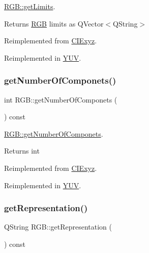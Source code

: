 \hyperlink{class_r_g_b_a4ae8d5c061e45f557a5924f2237c1d0e}{R\+G\+B\+::get\+Limits}. 

\begin{DoxyReturn}{Returns}
\hyperlink{class_r_g_b}{R\+GB} limits as Q\+Vector$<$\+Q\+String$>$ 
\end{DoxyReturn}


Reimplemented from \hyperlink{class_c_i_exyz_a4c3aa6777f7720ae26b53174322a83f8}{C\+I\+Exyz}.



Reimplemented in \hyperlink{class_y_u_v_a344cd573b663c97f5554afcb1c15458c}{Y\+UV}.

\mbox{\label{class_r_g_b_a7561d57d6706bc25ea10762d906b2345}} 
\subsubsection{\texorpdfstring{get\+Number\+Of\+Componets()}{getNumberOfComponets()}}
{\footnotesize\ttfamily int R\+G\+B\+::get\+Number\+Of\+Componets (\begin{DoxyParamCaption}{ }\end{DoxyParamCaption}) const\hspace{0.3cm}{\ttfamily [virtual]}}



\hyperlink{class_r_g_b_a7561d57d6706bc25ea10762d906b2345}{R\+G\+B\+::get\+Number\+Of\+Componets}. 

\begin{DoxyReturn}{Returns}
int 
\end{DoxyReturn}


Reimplemented from \hyperlink{class_c_i_exyz_af168733bb1bca36a7ae5d75c67de046e}{C\+I\+Exyz}.



Reimplemented in \hyperlink{class_y_u_v_a46eded5c13a0c2b2e9bbf05d4a2f9c7c}{Y\+UV}.

\mbox{\label{class_r_g_b_a5f7a68904e1e4f18c22c1066170fb2bf}} 
\subsubsection{\texorpdfstring{get\+Representation()}{getRepresentation()}}
{\footnotesize\ttfamily Q\+String R\+G\+B\+::get\+Representation (\begin{DoxyParamCaption}{ }\end{DoxyParamCaption}) const\hspace{0.3cm}{\ttfamily [virtual]}}



